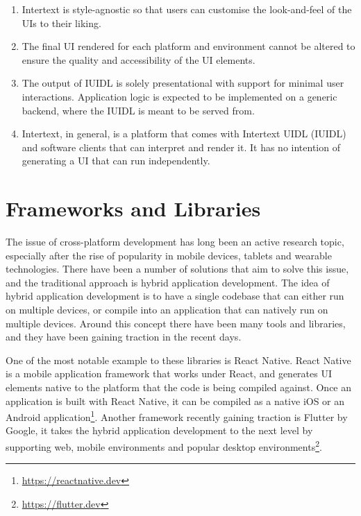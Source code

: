 \begin{enumerate}
  \item Intertext is style-agnostic so that users can customise the look-and-feel of the UIs to their liking.
  
  \item The final UI rendered for each platform and environment cannot be altered to ensure the quality and accessibility of the UI elements.
  
  \item The output of IUIDL is solely presentational with support for minimal user interactions. Application logic is expected to be implemented on a generic backend, where the IUIDL is meant to be served from.

  \item Intertext, in general, is a platform that comes with Intertext UIDL (IUIDL) and software clients that can interpret and render it. It has no intention of generating a UI that can run independently.
\end{enumerate}

\section{Frameworks and Libraries} \label{relatedTools}

The issue of cross-platform development has long been an active research topic, especially after the rise of popularity in mobile devices, tablets and wearable technologies. There have been a number of solutions that aim to solve this issue, and the traditional approach is hybrid application development. The idea of hybrid application development is to have a single codebase that can either run on multiple devices, or compile into an application that can natively run on multiple devices. Around this concept there have been many tools and libraries, and they have been gaining traction in the recent days.

One of the most notable example to these libraries is React Native. React Native is a mobile application framework that works under React, and generates UI elements native to the platform that the code is being compiled against. Once an application is built with React Native, it can be compiled as a native iOS or an Android application\footnote{\url{https://reactnative.dev}}. Another framework recently gaining traction is Flutter by Google, it takes the hybrid application development to the next level by supporting web, mobile environments and popular desktop environments\footnote{\url{https://flutter.dev}}.


